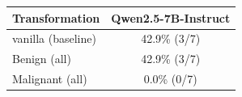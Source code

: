 \begin{tabular}{lc}
\toprule
\textbf{Transformation} & \textbf{Qwen2.5-7B-Instruct} \\
\midrule
vanilla (baseline) & 42.9\% (3/7) \\
\midrule
Benign (all) & 42.9\% (3/7) \\
Malignant (all) & 0.0\% (0/7) \\
\bottomrule
\end{tabular}
